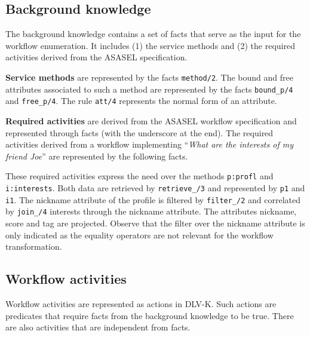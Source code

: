 \subsection{Background knowledge} \label{subsec:kb}
The background knowledge contains a set of facts that serve as the input for the workflow enumeration. It includes (1) the service methods and (2) the required activities derived from the ASASEL specification.

\vspace*{0.25cm}
\noindent               
\textbf{Service methods} are represented by the facts \texttt{method/2}. The bound and free attributes associated to such a method are represented by the facts \texttt{bound_p/4} and \texttt{free_p/4}. The rule \texttt{att/4} represents the normal form of an attribute.

%


\vspace*{0.25cm}
\textbf{Required activities} are derived from the ASASEL workflow specification and represented through facts (with the underscore at the end). The required activities derived from a workflow implementing ``\textit{What are the interests of my friend Joe}'' are represented by the following facts. 

%


\vspace*{0.25cm}
These required activities express the need over the methods \texttt{p:profl} and \texttt{i:interests}. Both data are retrieved by \texttt{retrieve\_/3} and represented by \texttt{p1} and \texttt{i1}. The nickname attribute of the profile is filtered by \texttt{filter\_/2} and correlated by \texttt{join\_/4} interests through the nickname attribute. The attributes nickname, score and tag are projected. Observe that the filter over the nickname attribute is only indicated as the equality operators are not relevant for the workflow transformation.

\subsection{Workflow activities}
Workflow activities are represented as actions in DLV-K. Such actions are predicates that require facts from the background knowledge to be true. There are also activities that are independent from facts.


